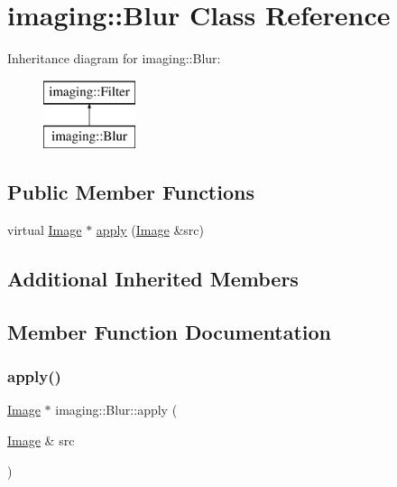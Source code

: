 \hypertarget{classimaging_1_1_blur}{}\section{imaging\+:\+:Blur Class Reference}
\label{classimaging_1_1_blur}
Inheritance diagram for imaging\+:\+:Blur\+:\begin{figure}[H]
\begin{center}
\leavevmode
\includegraphics[height=2.000000cm]{classimaging_1_1_blur}
\end{center}
\end{figure}
\subsection*{Public Member Functions}
\begin{DoxyCompactItemize}
\item 
virtual \hyperlink{classimaging_1_1_image}{Image} $\ast$ \hyperlink{classimaging_1_1_blur_a3b4898453abe24e7f0be3fbd2cba829c}{apply} (\hyperlink{classimaging_1_1_image}{Image} \&src)
\end{DoxyCompactItemize}
\subsection*{Additional Inherited Members}


\subsection{Member Function Documentation}
\mbox{\label{classimaging_1_1_blur_a3b4898453abe24e7f0be3fbd2cba829c}} 
\subsubsection{\texorpdfstring{apply()}{apply()}}
{\footnotesize\ttfamily \hyperlink{classimaging_1_1_image}{Image} $\ast$ imaging\+::\+Blur\+::apply (\begin{DoxyParamCaption}\item[{\hyperlink{classimaging_1_1_image}{Image} \&}]{src }\end{DoxyParamCaption})\hspace{0.3cm}{\ttfamily [virtual]}}


